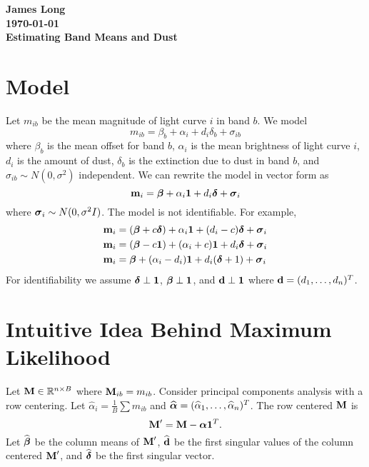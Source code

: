 \documentclass[12pt]{article}
\title{}
\date{}
\author{}
\newcommand{\V}[1]{{\bm{\mathbf{\MakeLowercase{#1}}}}} %
\newcommand{\M}[1]{{\bm{\mathbf{\MakeUppercase{#1}}}}} %
\begin{document}
\noindent
\textbf{James Long}\\
\textbf{\today}\\
\textbf{Estimating Band Means and Dust}

\section{Model}

Let $m_{ib}$ be the mean magnitude of light curve $i$ in band $b$. We model
\begin{equation*}
m_{ib} = \beta_b + \alpha_i + d_i\delta_b + \sigma_{ib}
\end{equation*}
where $\beta_b$ is the mean offset for band $b$, $\alpha_i$ is the mean brightness of light curve $i$, $d_i$ is the amount of dust, $\delta_b$ is the extinction due to dust in band $b$, and $\sigma_{ib} \sim N(0,\sigma^2)$ independent. We can rewrite the model in vector form as
\begin{equation*}
\V{m}_i = \V{\beta} + \alpha_i \V{1} + d_i \V{\delta} + \V{\sigma}_i
\end{equation*}
where $\V{\sigma}_i \sim N(0,\sigma^2I)$. The model is not identifiable. For example,
\begin{align*}
\V{m}_i &= (\V{\beta} + c\V{\delta}) + \alpha_i \V{1} + (d_i - c) \V{\delta} + \V{\sigma}_i\\
\V{m}_i &= (\V{\beta} - c\V{1}) + (\alpha_i + c)\V{1} + d_i\V{\delta} + \V{\sigma}_i\\
\V{m}_i &= \V{\beta} + (\alpha_i - d_i)\V{1} + d_i(\V{\delta} + 1) + \V{\sigma}_i\\
\end{align*}
For identifiability we assume $\V{\delta} \perp \V{1}$, $\V{\beta} \perp \V{1}$, and $\V{d} \perp \V{1}$ where $\V{d} = (d_1,\ldots,d_n)^T$.


\section{Intuitive Idea Behind Maximum Likelihood}

Let $\M{M} \in \mathbb{R}^{n \times B}$ where $\M{M}_{ib} = m_{ib}$. Consider principal components analysis with a row centering. Let $\widehat{\alpha}_i = \frac{1}{B} \sum m_{ib}$ and $\widehat{\V{\alpha}} = (\widehat{\alpha}_1,\ldots,\widehat{\alpha}_n)^T$. The row centered $\M{M}$ is
\begin{equation*}
\M{M}' = \M{M} - \V{\alpha}\V{1}^T.
\end{equation*}
Let $\widehat{\V{\beta}}$ be the column means of $\M{M}'$, $\widehat{\V{d}}$ be the first singular values of the column centered $\M{M}'$, and $\widehat{\V{\delta}}$ be the first singular vector.
\end{document}
